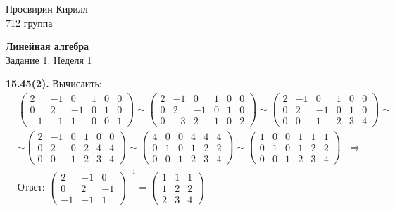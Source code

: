 \documentclass[a4paper,12pt]{article} %
\begin{document}

\hfill
\begin{minipage}{4.5cm}
	Просвирин Кирилл\\
	712 группа\\
\end{minipage}

\begin{center}
	\Large\textbf{Линейная алгебра\\} 
	\large Задание 1. Неделя 1
\end{center}

\noindent\textbf{15.45(2).}
Вычислить:
\begin{align}\label{key}
	&\left(
		\begin{array}{ccc|ccc}
		2 & -1 & 0    & 1 & 0 & 0\\
		0 & 2 & -1    & 0 & 1 & 0\\
		-1 & -1 & 1   & 0 & 0 & 1
		\end{array}
	\right)
	\sim
	\left(
		\begin{array}{ccc|ccc}
		2 & -1 & 0    & 1 & 0 & 0\\
		0 & 2 & -1    & 0 & 1 & 0\\
		0 & -3 & 2    & 1 & 0 & 2
		\end{array}
	\right)
	\sim
	\left(
		\begin{array}{ccc|ccc}
		2 & -1 & 0    & 1 & 0 & 0\\
		0 & 2 & -1    & 0 & 1 & 0\\
		0 & 0 & 1     & 2 & 3 & 4
		\end{array}
	\right)
	\sim\\
	&\sim\left(
		\begin{array}{ccc|ccc}
		2 & -1 & 0    & 1 & 0 & 0\\
		0 & 2 & 0    & 2 & 4 & 4\\
		0 & 0 & 1     & 2 & 3 & 4
		\end{array}
	\right)
	\sim
	\left(
		\begin{array}{ccc|ccc}
		4 & 0 & 0    & 4 & 4 & 4\\
		0 & 1 & 0    & 1 & 2 & 2\\
		0 & 0 & 1     & 2 & 3 & 4
		\end{array}
	\right)
	\sim
	\left(
		\begin{array}{ccc|ccc}
		1 & 0 & 0    & 1 & 1 & 1\\
		0 & 1 & 0    & 1 & 2 & 2\\
		0 & 0 & 1     & 2 & 3 & 4
		\end{array}
	\right)~~~\Longrightarrow\\
	&\textbf{Ответ: }
	\left(
	\begin{array}{ccc}
	2 & -1 & 0\\
	0 & 2 & -1\\
	-1 & -1 & 1
	\end{array}
	\right)^{-1}
	=
	\left(
		\begin{array}{ccc}
		1 & 1 & 1\\
		1 & 2 & 2\\
		2 & 3 & 4
		\end{array}
	\right)
\end{align}
\end{document}
